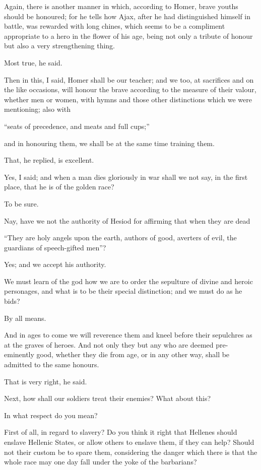 Again, there is another manner in which, according to Homer, brave
youths should be honoured; for he tells how Ajax, after he had
distinguished himself in battle, was rewarded with long chines, which
seems to be a compliment appropriate to a hero in the flower of his age,
being not only a tribute of honour but also a very strengthening thing.

Most true, he said.

Then in this, I said, Homer shall be our teacher; and we too, at
sacrifices and on the like occasions, will honour the brave according to
the measure of their valour, whether men or women, with hymns and those
other distinctions which we were mentioning; also with

``seats of precedence, and meats and full cups;''

and in honouring them, we shall be at the same time training them.

That, he replied, is excellent.

Yes, I said; and when a man dies gloriously in war shall we not say, in
the first place, that he is of the golden race?

To be sure.

Nay, have we not the authority of Hesiod for affirming that when they
are dead

``They are holy angels upon the earth, authors of good, averters of evil,
the guardians of speech-gifted men''?

Yes; and we accept his authority.

We must learn of the god how we are to order the sepulture of divine and
heroic personages, and what is to be their special distinction; and we
must do as he bids?

By all means.

And in ages to come we will reverence them and kneel before their
sepulchres as at the graves of heroes. And not only they but any who are
deemed pre-eminently good, whether they die from age, or in any other
way, shall be admitted to the same honours.

That is very right, he said.

Next, how shall our soldiers treat their enemies? What about this?

In what respect do you mean?

First of all, in regard to slavery? Do you think it right that Hellenes
should enslave Hellenic States, or allow others to enslave them, if
they can help? Should not their custom be to spare them, considering
the danger which there is that the whole race may one day fall under the
yoke of the barbarians?

